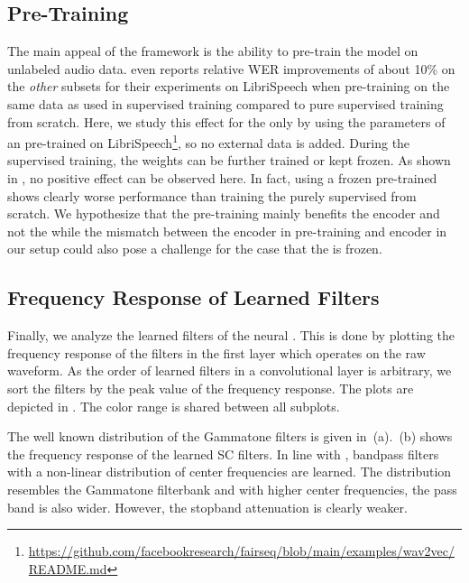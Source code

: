\documentclass{INTERSPEECH2023}
\begin{document}
\subsection{\wvtwo Pre-Training}
The main appeal of the \wvtwo framework is the ability to pre-train the model on unlabeled audio data.
\cite{facebook2020wav2vec2} even reports relative \gls{WER} improvements of about 10\% on the \textit{other} subsets for their experiments on LibriSpeech when pre-training on the same data as used in supervised training compared to pure supervised training from scratch.
Here, we study this effect for the \fe only by using the parameters of an \fe pre-trained on LibriSpeech\footnote{\raggedright\url{https://github.com/facebookresearch/fairseq/blob/main/examples/wav2vec/README.md}}, so no external data is added.
During the supervised training, the \fe weights can be further trained or kept frozen.
As shown in , no positive effect can be observed here.
In fact, using a frozen pre-trained \fe shows clearly worse performance than training the \fe purely supervised from scratch.
We hypothesize that the pre-training mainly benefits the \transformer encoder and not the \fe while the mismatch between the \transformer encoder in pre-training and \conformer encoder in our setup could also pose a challenge for the case that the \fe is frozen.


\subsection{Frequency Response of Learned Filters}
Finally, we analyze the learned filters of the neural \fes.
This is done by plotting the frequency response of the filters in the first layer which operates on the raw waveform.
As the order of learned filters in a convolutional layer is arbitrary, we sort the filters by the peak value of the frequency response.
The plots are depicted in .
The color range is shared between all subplots.

The well known distribution of the Gammatone filters is given in \,(a).
\,(b) shows the frequency response of the learned \gls{SC} filters.
In line with \cite{tuske2018:waveform}, bandpass filters with a non-linear distribution of center frequencies are learned.
The distribution resembles the Gammatone filterbank and with higher center frequencies, the pass band is also wider.
However, the stopband attenuation is clearly weaker.
\end{document}
